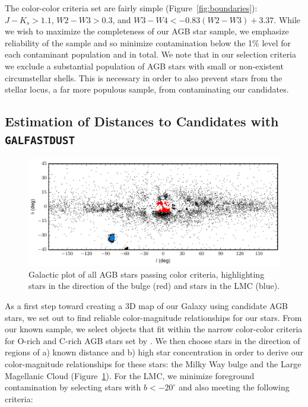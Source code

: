 The color-color criteria set are fairly simple (Figure~\ref{fig:boundaries}): $J-K_s > 1.1$, $W2-W3 > 0.3$, and $W3-W4 < -0.83(W2-W3) + 3.37$. While we wish to maximize the completeness of our AGB star sample, we emphasize reliability of the sample and so minimize contamination below the 1\% level for each contaminant population and in total. We note that in our selection criteria we exclude a substantial population of AGB stars with small or non-existent circumstellar shells. This is necessary in order to also prevent stars from the stellar locus, a far more populous sample, from contaminating our candidates.

\subsection{Estimation of Distances to Candidates with {\tt GALFASTDUST}}
\begin{figure}[h]
\includegraphics[width=6in]{figs/bulge_lmc_galcoords.pdf}
\caption{Galactic plot of all AGB stars passing color criteria, highlighting stars in the direction of the bulge (red) and stars in the LMC (blue).}
\label{fig:galplot}
\end{figure}

As a first step toward creating a 3D map of our Galaxy using candidate AGB stars, we set out to find reliable color-magnitude relationships for our stars. From our known sample, we select objects that fit within the narrow color-color criteria for O-rich and C-rich AGB stars set by \cite{2014MNRAS.442.3361N}. We then choose stars in the direction of regions of a) known distance and b) high star concentration in order to derive our color-magnitude relationships for these stars: the Milky Way bulge and the Large Magellanic Cloud (Figure~\ref{fig:galplot}). For the LMC, we minimize foreground contamination by selecting stars with $b < -20^\circ$ and also meeting the following criteria:

